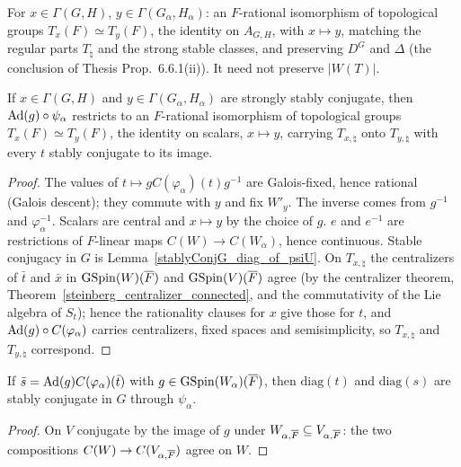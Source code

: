 \begin{definition}
\label{TorusTransfer}
\leanok
{}
For $x\in\Gamma(G,H)$, $y\in\Gamma(G_\alpha,H_\alpha)$: an $F$-rational isomorphism of topological groups
$T_x(F)\simeq T_y(F)$, the identity on $A_{G,H}$, with $x\mapsto y$, matching the regular parts $T_\natural$ and
the strong stable classes, and preserving $D^G$ and $\Delta$ (the conclusion of Thesis Prop.~6.6.1(ii)).
It need not preserve $|W(T)|$.
\end{definition}

\begin{lemma}
\label{exists_torusTransfer_core}
\leanok
{}
If $x\in\Gamma(G,H)$ and $y\in\Gamma(G_\alpha,H_\alpha)$ are strongly stably conjugate, then $\mathrm{Ad}(g)\circ\psi_\alpha$
restricts to an $F$-rational isomorphism of topological groups $T_x(F)\simeq T_y(F)$, the identity on scalars,
$x\mapsto y$, carrying $T_{x,\natural}$ onto $T_{y,\natural}$ with every $t$ stably conjugate to its image.
\end{lemma}
\begin{proof}
\leanok
{}
The values of $t\mapsto gC(\varphi_\alpha)(t)g^{-1}$ are Galois-fixed, hence rational
(Galois descent); they commute with $y$ and fix $W'_y$. The inverse comes from $g^{-1}$ and $\varphi_\alpha^{-1}$. Scalars are central and $x\mapsto y$ by the choice of $g$. $e$ and $e^{-1}$ are restrictions of $F$-linear maps $C(W)\to C(W_\alpha)$, hence continuous. Stable conjugacy in $G$ is Lemma~\ref{stablyConjG_diag_of_psiU}. On $T_{x,\natural}$ the centralizers of $\bar t$ and $\bar x$ in $\mathrm{GSpin}(W)(\overline{F})$ and $\mathrm{GSpin}(V)(\overline{F})$ agree (by the centralizer theorem, Theorem~\ref{steinberg_centralizer_connected}, and the commutativity of the Lie algebra of $S_t$); hence the rationality clauses for $x$ give those for $t$, and $\mathrm{Ad}(g)\circ C(\varphi_\alpha)$ carries centralizers, fixed spaces and semisimplicity, so $T_{x,\natural}$ and $T_{y,\natural}$ correspond.
\end{proof}

\begin{lemma}
\label{stablyConjG_diag_of_psiU}
\leanok
{}
If $\bar s=\mathrm{Ad}(g)C(\varphi_\alpha)(\bar t)$ with $g\in\mathrm{GSpin}(W_\alpha)(\overline{F})$, then $\mathrm{diag}(t)$ and $\mathrm{diag}(s)$ are stably conjugate in $G$ through $\psi_\alpha$.
\end{lemma}
\begin{proof}
\leanok
On $V$ conjugate by the image of $g$ under $W_{\alpha,\overline{F}}\subseteq V_{\alpha,\overline{F}}$: the two compositions $C(W)\to C(V_{\alpha,\overline{F}})$ agree on $W$.
\end{proof}

